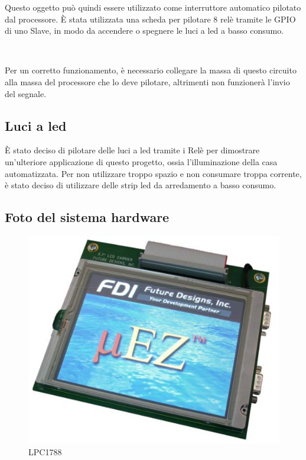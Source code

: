 \documentclass[a4paper,titlepage]{book}
\begin{document}
Questo oggetto può quindi essere utilizzato come interruttore automatico pilotato dal processore. È stata utilizzata una scheda per pilotare 8 relè tramite le GPIO di uno Slave, in modo da accendere o spegnere le luci a led a basso consumo.

~

Per un corretto funzionamento, è necessario collegare la massa di questo circuito alla massa del processore che lo deve pilotare, altrimenti non funzionerà l'invio del segnale.

\subsection{Luci a led}

È stato deciso di pilotare delle luci a led tramite i Relè per dimostrare un'ulteriore applicazione di questo progetto, ossia l'illuminazione della casa automatizzata. Per non utilizzare troppo spazio e non consumare troppa corrente, è stato deciso di utilizzare delle strip led da arredamento a basso consumo. 

\subsection{Foto del sistema hardware}

\begin{figure}[!ht]
\centering
\includegraphics[scale=1]{lpc1788.png}
\caption{LPC1788}
\end{figure}
\end{document}
